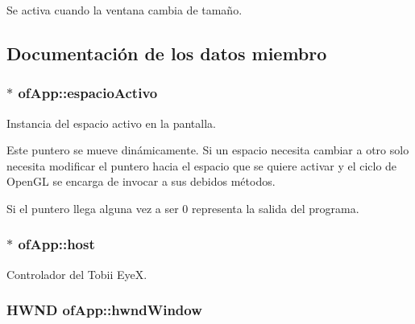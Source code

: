 Se activa cuando la ventana cambia de tamaño. 



\subsection{Documentación de los datos miembro}
\hypertarget{classof_app_a1e3e4e9da97b2a839dd1255c65f73453}{}
\subsubsection[{espacio\+Activo}]{$\ast$ of\+App\+::espacio\+Activo\hspace{0.3cm}{\ttfamily [private]}}\label{classof_app_a1e3e4e9da97b2a839dd1255c65f73453}


Instancia del espacio activo en la pantalla. 

Este puntero se mueve dinámicamente. Si un espacio necesita cambiar a otro solo necesita modificar el puntero hacia el espacio que se quiere activar y el ciclo de Open\+G\+L se encarga de invocar a sus debidos métodos.

Si el puntero llega alguna vez a ser 0 representa la salida del programa. \hypertarget{classof_app_afcf3654e64e9c180a113194cdb8a8e23}{}
\subsubsection[{host}]{$\ast$ of\+App\+::host\hspace{0.3cm}{\ttfamily [private]}}\label{classof_app_afcf3654e64e9c180a113194cdb8a8e23}


Controlador del Tobii Eye\+X. 

\hypertarget{classof_app_a764c01ed9a5c4bc9c3a4f6e6fed854c1}{}
\subsubsection[{hwnd\+Window}]{\setlength{\rightskip}{0pt plus 5cm}H\+W\+N\+D of\+App\+::hwnd\+Window\hspace{0.3cm}{\ttfamily [private]}}\label{classof_app_a764c01ed9a5c4bc9c3a4f6e6fed854c1}


